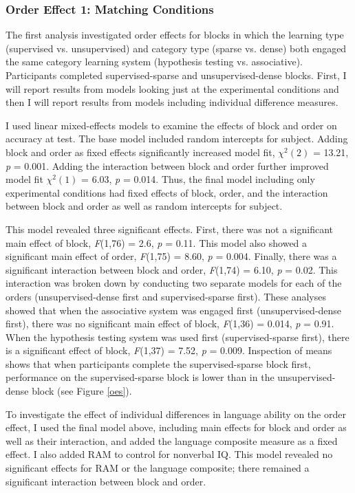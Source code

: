 \documentclass[../dissertation.tex]{subfiles}
\begin{document}
		
\subsubsection{Order Effect 1: Matching Conditions}
	The first analysis investigated order effects for blocks in which the learning type (supervised vs. unsupervised) and category type (sparse vs. dense) both engaged the same category learning system (hypothesis testing vs. associative). Participants completed supervised-sparse and unsupervised-dense blocks. First, I will report results from models looking just at the experimental conditions and then I will report results from models including individual difference measures. \par
	I used linear mixed-effects models to examine the effects of block and order on accuracy at test. The base model included random intercepts for subject. Adding block and order as fixed effects significantly increased model fit, $\chi^{2}(2)$ = 13.21,  \textit{p} = 0.001. Adding the interaction between block and order further improved model fit $\chi^{2}(1)$ = 6.03,  \textit{p} = 0.014. Thus, the final model including only experimental conditions had fixed effects of block, order, and the interaction between block and order as well as random intercepts for subject. \par
	This model revealed three significant effects. First, there was not a significant main effect of block, \textit{F}(1,76) = 2.6, \textit{p} = 0.11. This model also showed a significant main effect of order, \textit{F}(1,75) = 8.60, \textit{p} = 0.004. Finally, there was a significant interaction between block and order, \textit{F}(1,74) = 6.10, \textit{p} = 0.02. This interaction was broken down by conducting two separate models for each of the orders (unsupervised-dense first and supervised-sparse first). These analyses showed that when the associative system was engaged first (unsupervised-dense first), there was no significant main effect of block, \textit{F}(1,36) = 0.014, \textit{p} = 0.91. When the hypothesis testing system was used first (supervised-sparse first), there is a significant effect of block, \textit{F}(1,37) = 7.52, \textit{p} = 0.009. Inspection of means shows that when participants complete the supervised-sparse block first, performance on the supervised-sparse block is lower than in the unsupervised-dense block (see Figure \ref{oes}). \par
	To investigate the effect of individual differences in language ability on the order effect, I used the final model above, including main effects for block and order as well as their interaction, and added the language composite measure as a fixed effect. I also added RAM to control for nonverbal IQ. This model revealed no significant effects for RAM or the language composite; there remained a significant interaction between block and order.
\end{document}
